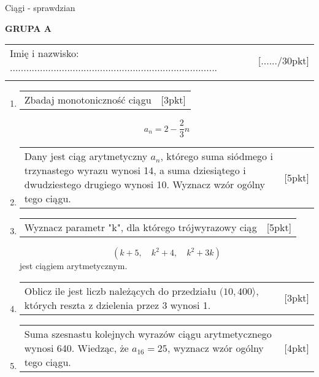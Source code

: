 \documentclass[12pt,a4paper]{article}
\begin{document}
	\begin{center}
		\LARGE Ciągi - sprawdzian
	\end{center}
	\vspace{1.5cm}
	\begin{flushright}
		\textbf{GRUPA A}
	\end{flushright}
	\begin{tabular}{p{13cm} r}
		Imię i nazwisko: ............................................................................
		&[....../30pkt]\\ 
		\vspace{0.5cm}
	\end{tabular}
	\begin{enumerate}[1.]
		\item  \begin{tabular}{p{13cm} r}
			Zbadaj monotoniczność ciągu  &[3pkt]\\ 
		\end{tabular}
	$$a_n=2-\frac{2}{3}n$$
		
		\item  \begin{tabular}{p{13cm} r}
			Dany jest ciąg arytmetyczny $a_n$, którego suma siódmego i trzynastego wyrazu wynosi 14, a suma dziesiątego i dwudziestego drugiego wynosi 10. Wyznacz wzór ogólny tego ciągu. 
			 &[5pkt]\\ 
		\end{tabular}
		
		\item \begin{tabular}{p{13cm} r}
			Wyznacz parametr "k", dla którego trójwyrazowy ciąg
			 &[5pkt]\\
		\end{tabular}
	$$(k+5,\quad k^2+4, \quad k^2+3k)$$
	jest ciągiem arytmetycznym. 
		
		\item \begin{tabular}{p{13cm} r}
			Oblicz ile jest liczb należących do przedziału $(10,400\rangle$, których reszta z dzielenia przez 3 wynosi 1.&[3pkt]\\ 
		\end{tabular}
		
		\item \begin{tabular}{p{13cm} r}
			Suma szesnastu kolejnych wyrazów ciągu arytmetycznego wynosi 640. Wiedząc, że $a_{16}=25$, wyznacz wzór ogólny tego ciągu.&[4pkt]\\ 
		\end{tabular}
		

\end{enumerate}
\end{document}
